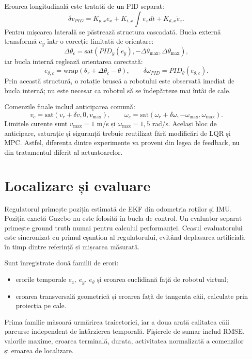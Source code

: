 \documentclass[12pt,a4paper]{article}
\begin{document}
Eroarea longitudinală este tratată de un PID separat:
\begin{equation}
  \delta v_{PID}=K_{p,x}e_x+K_{i,x}\int e_xdt+K_{d,x}\dot e_x.
\end{equation}
Pentru mișcarea laterală se păstrează structura cascadată. Bucla externă
transformă $e_y$ într-o corecție limitată de orientare:
\begin{equation}
  \Delta\theta_c=\mathrm{sat}\left(PID_y(e_y),
  -\Delta\theta_{\max},\Delta\theta_{\max}\right),
\end{equation}
iar bucla internă reglează orientarea corectată:
\begin{equation}
  e_{\theta,c}=\mathrm{wrap}(\theta_r+\Delta\theta_c-\theta),
  \qquad \delta\omega_{PID}=PID_{\theta}(e_{\theta,c}).
\end{equation}
Prin această structură, o rotație bruscă a robotului este observată imediat de
bucla internă; nu este necesar ca robotul să se îndepărteze mai întâi de cale.

Comenzile finale includ anticiparea comună:
\begin{equation}
  v_c=\mathrm{sat}(v_r+\delta v,0,v_{\max}),\qquad
  \omega_c=\mathrm{sat}(\omega_r+\delta\omega,
  -\omega_{\max},\omega_{\max}).
\end{equation}
Limitele curente sunt $v_{\max}=1$ m/s și $\omega_{\max}=1{,}5$ rad/s. Același
bloc de anticipare, saturație și siguranță trebuie reutilizat fără modificări
de LQR și MPC. Astfel, diferența dintre experimente va proveni din legea de
feedback, nu din tratamentul diferit al actuatoarelor.

\section{Localizare și evaluare}

Regulatorul primește poziția estimată de EKF din odometria roților și IMU.
Poziția exactă Gazebo nu este folosită în bucla de control. Un evaluator separat
primește ground truth numai pentru calculul performanței. Ceasul evaluatorului
este sincronizat cu primul eșantion al regulatorului, evitând deplasarea
artificială în timp dintre referință și mișcarea măsurată.

Sunt înregistrate două familii de erori:
\begin{itemize}
  \item erorile temporale $e_x$, $e_y$, $e_{\theta}$ și eroarea euclidiană față
  de robotul virtual;
  \item eroarea transversală geometrică și eroarea față de tangenta căii,
  calculate prin proiecția pe cale.
\end{itemize}
Prima familie măsoară urmărirea traiectoriei, iar a doua arată calitatea căii
parcurse independent de întârzierea temporală. Fișierele de sumar includ RMSE,
valorile maxime, eroarea terminală, durata, activitatea normalizată a comenzilor
și eroarea de localizare.
\end{document}
